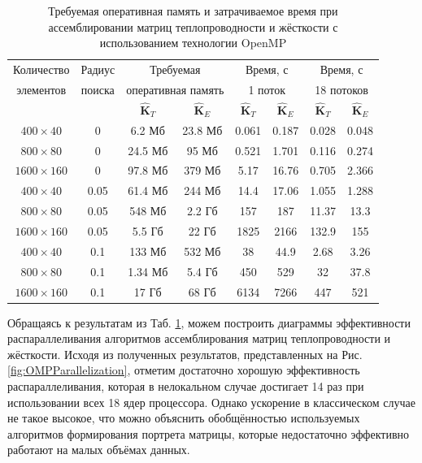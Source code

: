 \begin{table}[htbp]
    \centering
    \begin{threeparttable}%
        \caption{Требуемая оперативная память и затрачиваемое время при ассемблировании матриц теплопроводности и жёсткости с использованием технологии OpenMP}\label{tab:OpenMP}
        \begin{tabular}{|c|c|c|c|c|c|c|c|}
	\hline
	Количество & Радиус & \multicolumn{2}{c|}{Требуемая}   & \multicolumn{2}{c|}{Время, с} & \multicolumn{2}{c|}{Время, с} \\
	элементов  & поиска & \multicolumn{2}{c|}{оперативная память} & \multicolumn{2}{c|}{1 поток}  & \multicolumn{2}{c|}{18 потоков} \\
	\cline{3-8}
	      &        & $\widehat{\textbf{K}}_T$ & $\widehat{\textbf{K}}_E$ & $\widehat{\textbf{K}}_T$ & $\widehat{\textbf{K}}_E$ & $\widehat{\textbf{K}}_T$ & $\widehat{\textbf{K}}_E$ \\
	\hline
	$400 \times 40$   & 0    & 6.2 Мб  & 23.8 Мб & 0.061 & 0.187 & 0.028 & 0.048 \\
	\hline
	$800 \times 80$   & 0    & 24.5 Мб & 95 Мб   & 0.521 & 1.701 & 0.116 & 0.274 \\
	\hline
	$1600 \times 160$ & 0    & 97.8 Мб & 379 Мб  & 5.17  & 16.76 & 0.705 & 2.366 \\
	\hline
	$400 \times 40$   & 0.05 & 61.4 Мб & 244 Мб  & 14.4  & 17.06 & 1.055 & 1.288 \\
	\hline
	$800 \times 80$   & 0.05 & 548 Мб  & 2.2 Гб  & 157   & 187   & 11.37 & 13.3  \\
	\hline
	$1600 \times 160$ & 0.05 & 5.5 Гб  & 22 Гб   & 1825  & 2166  & 132.9 & 155   \\
	\hline
	$400 \times 40$   & 0.1  & 133 Мб  & 532 Мб  & 38    & 44.9  & 2.68  & 3.26  \\
	\hline
	$800 \times 80$   & 0.1  & 1.34 Мб & 5.4 Гб  & 450   & 529   & 32    & 37.8  \\
	\hline
	$1600 \times 160$ & 0.1  & 17 Гб   & 68 Гб   & 6134  & 7266  & 447   & 521   \\
	\hline
        \end{tabular}
    \end{threeparttable}
\end{table}

Обращаясь к результатам из Таб. \ref{tab:OpenMP}, можем построить диаграммы эффективности распараллеливания алгоритмов ассемблирования матриц теплопроводности и жёсткости. Исходя из полученных результатов, представленных на Рис. \ref{fig:OMPParallelization}, отметим достаточно хорошую эффективность распараллеливания, которая в нелокальном случае достигает 14 раз при использовании всех 18 ядер процессора. Однако ускорение в классическом случае не такое высокое, что можно объяснить обобщённостью используемых алгоритмов формирования портрета матрицы, которые недостаточно эффективно работают на малых объёмах данных.

